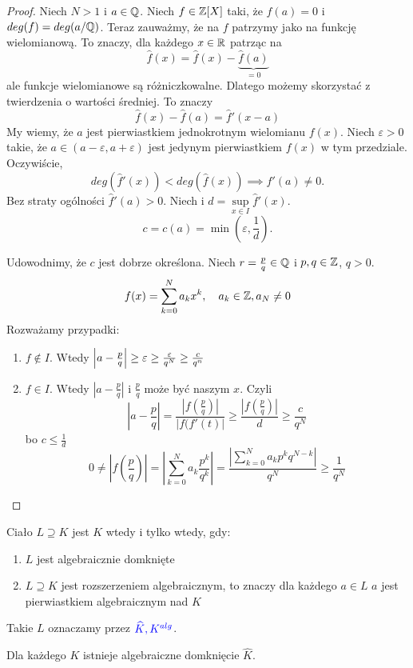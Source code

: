 \begin{proof}
Niech $N>1$ i $a\in\Q$. Niech $f\in\Z[X]$ taki, że $f(a)=0$ i $deg(f)=deg(a/\Q)$. Teraz zauważmy, że na $f$ patrzymy jako na funkcję wielomianową. To znaczy, dla każdego $x\in\R$ patrząc na
$$\hat{f}(x)=\hat{f}(x)-\underbrace{\hat{f}(a)}_{=0}$$
ale funkcje wielomianowe są różniczkowalne. Dlatego możemy skorzystać z twierdzenia o wartości średniej. To znaczy
$$\hat{f}(x)-\hat{f}(a)=\hat{f}'(x-a)$$
My wiemy, że $a$ jest pierwiastkiem jednokrotnym wielomianu $f(x)$. Niech $\varepsilon>0$ takie, że $a\in(a-\varepsilon,a+\varepsilon)$ jest jedynym pierwiastkiem $f(x)$ w tym przedziale. Oczywiście, 
$$deg(\hat{f}'(x))<deg(\hat{f}(x))\implies\hat{f}'(a)\neq 0.$$ 
Bez straty ogólności $\hat{f}'(a)>0$. Niech i $d=\sup\limits_{x\in I}\hat{f}'(x)$.
$$c=c(a)=\min(\varepsilon, \frac1{d}).$$

Udowodnimy, że $c$ jest dobrze określona. Niech $r=\frac{p}{q}\in\Q$ i $p,q\in\Z$, $q>0$.
$$f(x)=\sum\limits_{k=0}^Na_kx^k,\quad a_k\in\Z,a_N\neq0$$
Rozważamy przypadki:
\begin{enumerate}
    \item $f\notin I$. Wtedy $\left|a-\frac{p}{q}\right|\geq\varepsilon\geq {\varepsilon\over q^N}\geq \frac{c}{q^n}$
    \item $f\in I$. Wtedy $\left|a-\frac{p}{q}\right|$ i $\frac{p}{q}$ może być naszym $x$. Czyli 
    $$\left|a-\frac{p}{q}\right|=\frac{|f(\frac{p}{q})|}{|f(f'(t)|}\geq \frac{|f(\frac{p}{q})|}{d}\geq\frac{c}{q^N}$$
    bo $c\leq\frac1{d}$ $$0\neq|f(\frac{p}{q})|=\left|\sum\limits_{k=0}^Na_k\frac{p^k}{q^k}\right|=\frac{\left|\sum\limits_{k=0}^Na_kp^kq^{N-k}\right|}{q^N}\geq\frac{1}{q^N}$$
\end{enumerate}
\end{proof}


\begin{definicja}
    Ciało $L\supseteq K$ jest  $K$ wtedy i tylko wtedy, gdy:
    \begin{enumerate}
        \item $L$ jest algebraicznie domknięte
        \item $L\supseteq K$ jest rozszerzeniem algebraicznym, to znaczy dla każdego $a\in L$ $a$ jest pierwiastkiem algebraicznym nad $K$
    \end{enumerate}
    Takie $L$ oznaczamy przez $\color{blue}\hat{K},K^{alg}$.
\end{definicja}

\begin{wniosek}
    Dla każdego $K$ istnieje algebraiczne domknięcie $\hat{K}$.
\end{wniosek}

